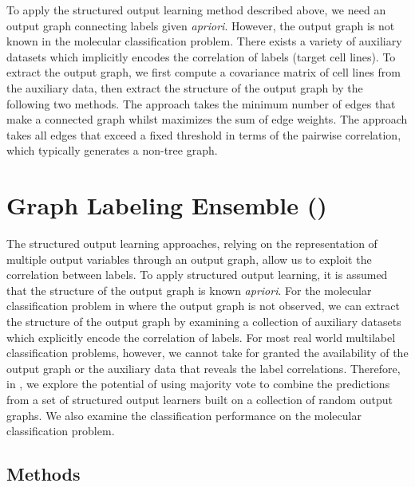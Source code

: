 {%
To apply the structured output learning method described above, we need an output graph connecting labels given \textit{apriori}.
However, the output graph is not known in the molecular classification problem.
There exists a variety of auxiliary datasets \citep{Shoemaker06the} which implicitly encodes the correlation of labels (target cell lines).
To extract the output graph, we first compute a covariance matrix of cell lines from the auxiliary data, then extract the structure of the output graph by the following two methods.
The  approach takes the minimum number of edges that make a connected graph whilst maximizes the sum of edge weights.
The  approach takes all edges that exceed a fixed threshold in terms of the pairwise correlation, which typically generates a non-tree graph.



%
%
\section{Graph Labeling Ensemble (\mve)}\label{sc_su11}

The structured output learning approaches, relying on the representation of multiple output variables through an output graph, allow us to exploit the correlation between labels.
To apply structured output learning, it is assumed that the structure of the output graph is known \textit{apriori}.
For the molecular classification problem in  where the output graph is not observed, we can extract the structure of the output graph by examining a collection of auxiliary datasets which explicitly encode the correlation of labels.
For most real world multilabel classification problems, however, we cannot take for granted the availability of the output graph or the auxiliary data that reveals the label correlations.
Therefore, in , we explore the potential of using majority vote to combine the predictions from a set of structured output learners built on a collection of random output graphs.
We also examine the classification performance on the molecular classification problem.


%
%
\subsection{Methods}

}
